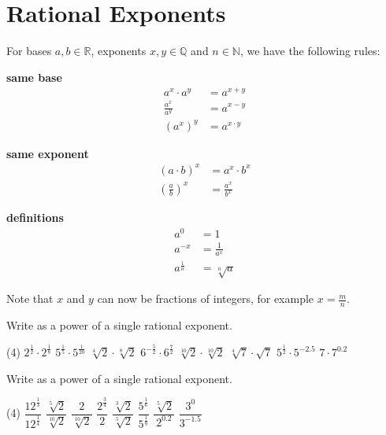 \section{Rational Exponents}
\begin{tcolorbox}
	For bases $a,b\in\mathbb R$, exponents $x,y\in\mathbb Q$ and $n\in\mathbb N$, we have the following rules:
	\begin{multicols}{3}
		\centering
		\textbf{same base}\\
		\begin{align*}
			a^x\cdot a^y&=a^{x+y} \\[8pt]
			\frac{a^x}{a^y}&=a^{x-y} \\[8pt]
			\left(a^x\right)^y&=a^{x\cdot y}
		\end{align*}
		\vfill
		\columnbreak
		
		\textbf{same exponent}\\
		\begin{align*}
			\left(a\cdot b\right)^x&=a^x\cdot b^x \\[8pt]
			\left(\frac{a}{b}\right)^x&=\frac{a^x}{b^x}
		\end{align*}
		\vfill
		\columnbreak
		
		\textbf{definitions}\\
		\begin{align*}
			a^0&=1 \\[8pt]
			a^{-x}&=\frac{1}{a^x} \\[8pt]
			a^{\frac{1}{n}}&=\sqrt[n]{a}
		\end{align*}
		\vfill
	\end{multicols}
	Note that $x$ and $y$ can now be fractions of integers, for example $x=\frac{m}{n}$.
\end{tcolorbox}
\begin{exercise}
	Write as a power of a single rational exponent.
	\begin{tasks}(4)
		\task $2^\frac{1}{2}\cdot 2^\frac{1}{8}$
		\task $5^\frac{1}{5}\cdot 5^\frac{1}{20}$
		\task $\sqrt[4]{2}\cdot\sqrt[8]{2}$
		\task $6^{-\frac{5}{2}}\cdot 6^\frac{7}{2}$
		\task $\sqrt[10]{2}\cdot\sqrt[10]{2}$
		\task $\sqrt[4]{7}\cdot\sqrt{7}$
		\task $5^{\frac{1}{2}}\cdot 5^{-2.5}$
		\task $7\cdot 7^{0.2}$
	\end{tasks}
\end{exercise}
\begin{exercise}
	Write as a power of a single rational exponent.
	\begin{tasks}(4)
		\task $\dfrac{12^\frac{1}{3}}{12^\frac{1}{4}}$
		\task $\dfrac{\sqrt[5]{2}}{\sqrt[10]{2}}$
		\task $\dfrac{2}{\sqrt[10]{2}}$
		\task $\dfrac{2^{\frac{3}{4}}}{2}$
		\task $\dfrac{\sqrt[3]{2}}{\sqrt[5]{2}}$
		\task $\dfrac{5^{\frac{1}{6}}}{5^\frac{1}{9}}$
		\task $\dfrac{\sqrt[5]{2}}{2^{0.2}}$
		\task $\dfrac{3^0}{3^{-1.5}}$
	\end{tasks}
\end{exercise}
